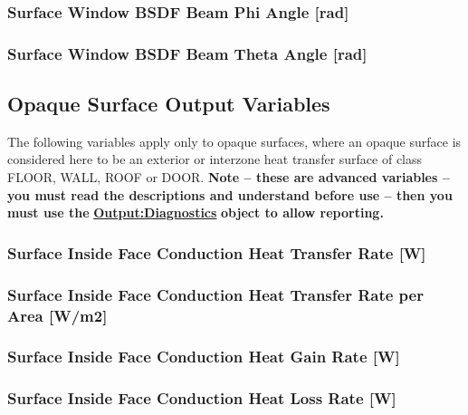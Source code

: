 \subsubsection{Surface Window BSDF Beam Phi Angle {[}rad{]}}\label{surface-window-bsdf-beam-phi-angle-rad}

\subsubsection{Surface Window BSDF Beam Theta Angle {[}rad{]}}\label{surface-window-bsdf-beam-theta-angle-rad}

\subsection{Opaque Surface Output Variables}\label{opaque-surface-output-variables}

The following variables apply only to opaque surfaces, where an opaque surface is considered here to be an exterior or interzone heat transfer surface of class FLOOR, WALL, ROOF or DOOR. \textbf{Note -- these are advanced variables -- you must read the descriptions and understand before use -- then you must use the} \textbf{\hyperref[outputdiagnostics]{Output:Diagnostics}} \textbf{object to allow reporting.}

\subsubsection{Surface Inside Face Conduction Heat Transfer Rate {[}W{]}}\label{surface-inside-face-conduction-heat-transfer-rate-w}

\subsubsection{Surface Inside Face Conduction Heat Transfer Rate per Area {[}W/m2{]}}\label{surface-inside-face-conduction-heat-transfer-rate-per-area-wm2}

\subsubsection{Surface Inside Face Conduction Heat Gain Rate {[}W{]}}\label{surface-inside-face-conduction-heat-gain-rate-w}

\subsubsection{Surface Inside Face Conduction Heat Loss Rate {[}W{]}}\label{surface-inside-face-conduction-heat-loss-rate-w}

